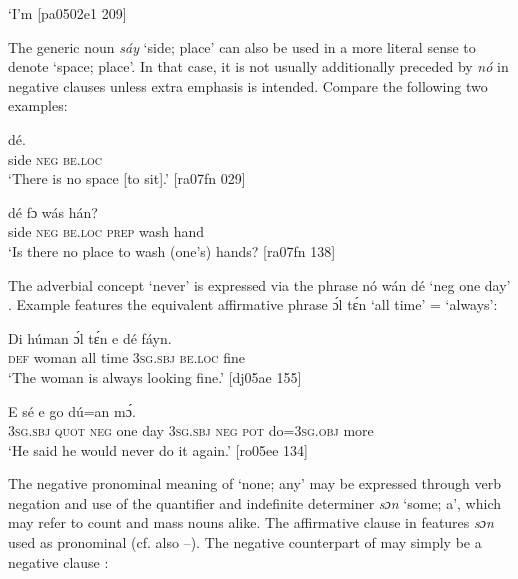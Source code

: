 \glt ‘I’m [pa0502e1 209]
\z

The generic noun \textit{sáy} ‘side; place’ can also be used in a more literal sense to denote ‘space; place’. In that case, it is not usually additionally preceded by \textit{nó} in negative clauses unless extra emphasis is intended. Compare the following two examples: 


\ea%
    \label{ex:key:567}
    \gll {}    dé.\\
side  \textsc{neg}  \textsc{be.loc}\\

\glt ‘There is no space [to sit].’ [ra07fn 029]
\z


\ea%
    \label{ex:key:568}
    \gll {}    dé    fɔ  wás    hán?\\
side  \textsc{neg}  \textsc{be.loc}  \textsc{prep}  wash  hand\\

\glt ‘Is there no place to wash (one’s) hands? [ra07fn 138]
\z

The adverbial concept ‘never’ is expressed via the phrase nó wán dé ‘neg one day’ . Example  features the equivalent affirmative phrase ɔ́l tɛ́n ‘all time’ = ‘always’: 


\ea%
    \label{ex:key:569}
    \gll Di  húman  ɔ́l  tɛ́n  e    dé    fáyn.\\
\textsc{def}  woman  all  time  \textsc{3sg.sbj}  \textsc{be.loc}  fine\\

\glt ‘The woman is always looking fine.’ [dj05ae 155]
\z


\ea%
    \label{ex:key:570}
    \gll E    sé          e      go  dú=an    mɔ́.\\
\textsc{3sg.sbj}  \textsc{quot}    \textsc{neg}  one  day  \textsc{3sg.sbj}  \textsc{neg}  \textsc{pot}  do=\textsc{3sg.obj}  more\\

\glt ‘He said he would never do it again.’ [ro05ee 134]
\z

The negative pronominal meaning of ‘none; any’ may be expressed through verb negation and use of the quantifier and indefinite determiner \textit{sɔn} ‘some; a’, which may refer to count and mass nouns alike. The affirmative clause in  features \textit{sɔn} used as pronominal (cf. also –). The negative counterpart of  may simply be a negative clause :


